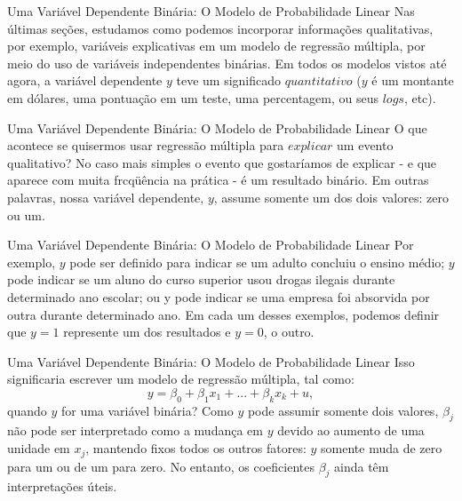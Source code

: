 \documentclass[t,14pt,mathserif]{beamer}
\begin{document}
{
\begin{frame}{Uma Variável Dependente Binária: O Modelo de Probabilidade Linear}
		\justifying
       \vfill
      Nas últimas seções, estudamos como podemos incorporar informações qualitativas, por exemplo, variáveis explicativas em um modelo de regressão múltipla, por meio do uso de variáveis independentes binárias.
        \vfill
       Em todos os modelos vistos até agora, a variável dependente $y$ teve um significado $quantitativo$ ($y$ é um montante em dólares, uma pontuação em um teste, uma percentagem, ou seus $logs$, etc).
      
        \end{frame}
}  

{
\begin{frame}{Uma Variável Dependente Binária: O Modelo de Probabilidade Linear}
		\justifying
       \vfill
        O que acontece se quisermos usar regressão múltipla para $explicar$ um evento qualitativo?
        \vfill
        No caso mais simples o evento que gostaríamos de explicar - e que aparece com muita frcqüência na prática - é um resultado binário.
        \vfill
        Em outras palavras, nossa variável dependente, $y$, assume somente um dos dois valores: zero ou um.
        \end{frame}
}  

{
\begin{frame}{Uma Variável Dependente Binária: O Modelo de Probabilidade Linear}
		\justifying
       \vfill
       Por exemplo, $y$ pode ser definido para indicar se um adulto concluiu o ensino médio;
        \vfill
        $y$ pode indicar se um aluno do curso superior usou drogas ilegais durante determinado ano escolar;
        \vfill
        ou y pode indicar se uma empresa foi absorvida por outra durante determinado ano.
        \vfill
        Em cada um desses exemplos, podemos definir que $y = 1$ represente um dos resultados e $y = 0$, o outro.
        \end{frame}
}  

{
\begin{frame}{Uma Variável Dependente Binária: O Modelo de Probabilidade Linear}
		\justifying 
        \vfill
        Isso significaria escrever um modelo de regressão múltipla, tal como:
        \begin{equation}
        y = \beta_{0} + \beta_{1}x_1 + ... + \beta_{k}x_k + u, \nonumber
        \end{equation}
        quando $y$ for uma variável binária? Como $y$ pode assumir somente dois valores, $\beta_{j}$ não pode ser interpretado como a mudança em $y$ devido ao aumento de uma unidade em $x_j$, mantendo fixos todos os
        outros fatores: $y$ somente muda de zero para um ou de um para zero. No entanto, os coeficientes $\beta_{j}$ ainda têm interpretações úteis.
        \end{frame}
}  
\end{document}
